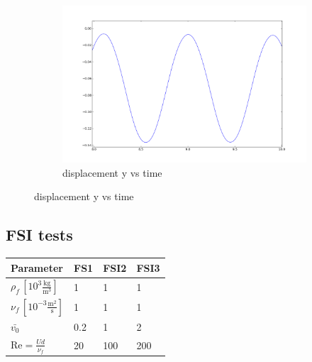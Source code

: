 \begin{figure}[!ht]
\begin{subfigure}[b]{0.5\linewidth}
\end{subfigure}
\begin{subfigure}[b]{0.5\linewidth}
\includegraphics[width=\linewidth]{figures/CSM3/CSM3_2_y}\caption{displacement y vs time}
\end{subfigure}
\end{figure}
\clearpage

\subsection{FSI tests}
\begin{table}[!h]
\begin{center}
  \begin{tabular}{|l | l | l | l|} \hline
	Parameter & FS1 & FSI2 & FSI3 \\ \hline
    $\rho_f\, [10^3\frac{\text{kg}}{\text{m}^3}]$  & 1 & 1 & 1 \\   \hline
    $\nu_f\, [10^{-3}\frac{\text{m}^2}{\text{s}}]$ & 1 & 1 & 1 \\ \hline
    $\bar{v_0}$ & 0.2 & 1 & 2   \\ \hline \hline
    $\text{Re} = \frac{Ud}{\nu_f}$ & 20 & 100 & 200 \\ \hline
    \hline
  \end{tabular}
\end{center}
\end{table}

